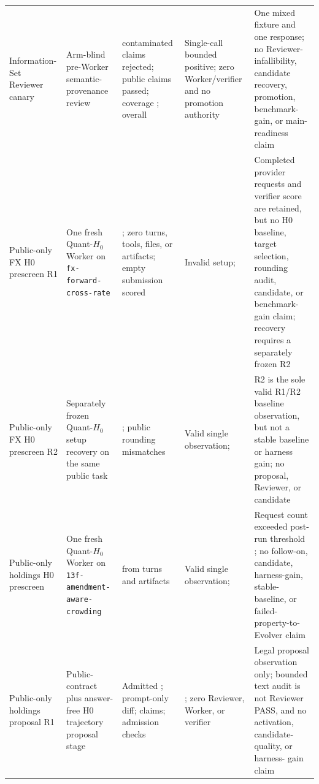 \begin{table}[t]
\begin{tabular}{p{}p{}p{}p{}p{}}
Information-Set Reviewer canary & Arm-blind pre-Worker semantic-provenance
review & \InfoSetReviewerRejects{} contaminated claims rejected;
\InfoSetReviewerPasses{} public claims passed; coverage
\InfoSetReviewerCoverage{}; overall \InfoSetReviewerOverall{} & Single-call
bounded positive; zero Worker/verifier and no promotion authority & One mixed
fixture and one response; no Reviewer-infallibility, candidate recovery,
promotion, benchmark-gain, or main-readiness claim \\

Public-only FX H0 prescreen R1 & One fresh Quant-$H_0$ Worker on
\texttt{fx-forward-cross-rate} & \FXHZeroROneOutcome{}; zero turns, tools,
files, or artifacts; empty submission scored \FXHZeroROneOfficial{} & Invalid
setup; \FXHZeroROneDecision{} & Completed provider requests and verifier score
are retained, but no H0 baseline, target selection, rounding audit, candidate,
or benchmark-gain claim; recovery requires a separately frozen R2 \\

Public-only FX H0 prescreen R2 & Separately frozen Quant-$H_0$ setup recovery
on the same public task & \FXHZeroRTwoOfficial{}; public rounding mismatches
\FXHZeroRTwoRoundingMismatch{} & Valid single observation;
\FXHZeroRTwoDecision{} & R2 is the sole valid R1/R2 baseline observation, but
not a stable baseline or harness gain; no proposal, Reviewer, or candidate \\

Public-only holdings H0 prescreen & One fresh Quant-$H_0$ Worker on
\texttt{13f-amendment-aware-crowding} & \HoldingsHZeroOfficial{} from
\HoldingsHZeroTurns{} turns and \HoldingsHZeroArtifacts{} artifacts & Valid
single observation; \HoldingsHZeroDecision{} & Request count
\HoldingsHZeroRequests{} exceeded post-run threshold
\HoldingsHZeroRequestThreshold{}; no follow-on, candidate, harness-gain, stable-
baseline, or failed-property-to-Evolver claim \\

Public-only holdings proposal R1 & Public-contract plus answer-free H0
trajectory proposal stage & Admitted \HoldingsProposalDecision{};
\HoldingsProposalMutation{} prompt-only diff; \HoldingsProposalClaims{} claims;
\HoldingsProposalAdmission{} admission checks & \HoldingsProposalStop{}; zero
Reviewer, Worker, or verifier & Legal proposal observation only; bounded text
audit is not Reviewer PASS, and no activation, candidate-quality, or harness-
gain claim \\


\end{tabular}
\end{table}
